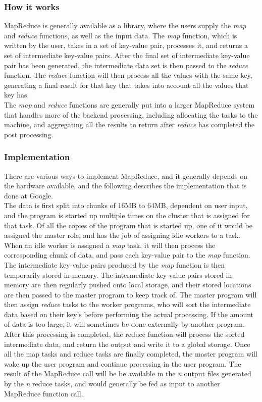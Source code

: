 \documentclass[]{article}
\begin{document}
\subsubsection{How it works}
MapReduce is generally available as a library, where the users supply the \emph{map} and \emph{reduce} functions, as well as the input data. The \emph{map} function, which is written by the user, takes in a set of key-value pair, processes it, and returns a set of intermediate key-value pairs. After the final set of intermediate key-value pair has been generated, the intermediate data set is then passed to the \emph{reduce} function. The \emph{reduce} function will then process all the values with the same key, generating a final result for that key that takes into account all the values that key has.\\

The \emph{map} and \emph{reduce} functions are generally put into a larger MapReduce system that handles more of the backend processing, including allocating the tasks to the machine, and aggregating all the results to return after \emph{reduce} has completed the post processing.\\


\subsubsection{Implementation}
There are various ways to implement MapReduce, and it generally depends on the hardware available, and the following describes the implementation that is done at Google.\\

The data is first split into chunks of 16MB to 64MB, dependent on user input, and the program is started up multiple times on the cluster that is assigned for that task. Of all the copies of the program that is started up, one of it would be assigned the master role, and has the job of assigning idle workers to a task. When an idle worker is assigned a \emph{map} task, it will then process the corresponding chunk of data, and pass each key-value pair to the \emph{map} function. The intermediate key-value pairs produced by the \emph{map} function is then temporarily stored in memory. The intermediate key-value pairs stored in memory are then regularly pushed onto local storage, and their stored locations are then passed to the master program to keep track of. The master program will then assign \emph{reduce} tasks to the worker programs, who will sort the intermediate data based on their key's before performing the actual processing. If the amount of data is too large, it will sometimes be done externally by another program. After this processing is completed, the reduce function will process the sorted intermediate data, and return the output and write it to a global storage. Once all the map tasks and reduce tasks are finally completed, the master program will wake up the user program and continue processing in the user program. The result of the MapReduce call will be be available in the \emph{n} output files generated by the \emph{n} reduce tasks, and would generally be fed as input to another MapReduce function call.\\
\end{document}
